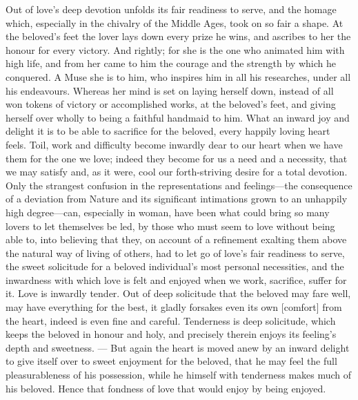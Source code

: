 \documentclass[12pt,a4paper]{book}
\begin{document}
Out of love's deep devotion unfolds its fair readiness to serve, and the
homage which, especially in the chivalry of the Middle Ages, took on so
fair a shape. At the beloved's feet the lover lays down every prize he
wins, and ascribes to her the honour for every victory. And rightly; for
she is the one who animated him with high life, and from her came to him
the courage and the strength by which he conquered. A Muse she is to him,
who inspires him in all his researches, under all his endeavours. Whereas
her mind is set on laying herself down, instead of all won tokens of
victory or accomplished works, at the beloved's feet, and giving herself
over wholly to being a faithful handmaid to him. What an inward joy and
delight it is to be able to sacrifice for the beloved, every happily loving
heart feels. Toil, work and difficulty become inwardly dear to our heart
when we have them for the one we love; indeed they become for us a need and
a necessity, that we may satisfy and, as it were, cool our forth-striving
desire for a total devotion. Only the strangest confusion in the
representations and feelings---the consequence of a deviation from Nature
and its significant intimations grown to an unhappily high degree---can,
especially in woman, have been what could bring so many lovers to let
themselves be led, by those who must seem to love without being able to,
into believing that they, on account of a refinement exalting them above
the natural way of living of others, had to let go of love's fair
readiness to serve, the sweet solicitude for a beloved individual's most
personal necessities, and the inwardness with which love is felt and
enjoyed when we work, sacrifice, suffer for it. Love is inwardly tender.
Out of deep solicitude that the beloved may fare well, may have everything
for the best, it gladly forsakes even its own [comfort] from the heart,
indeed is even fine and careful. Tenderness is deep solicitude, which keeps
the beloved in honour and holy, and precisely therein enjoys its feeling's
depth and sweetness. --- But again the heart is moved anew by an inward
delight to give itself over to sweet enjoyment for the beloved, that he may
feel the full pleasurableness of his possession, while he himself with
tenderness makes much of his beloved. Hence that fondness of love that
would enjoy by being enjoyed.
\end{document}
